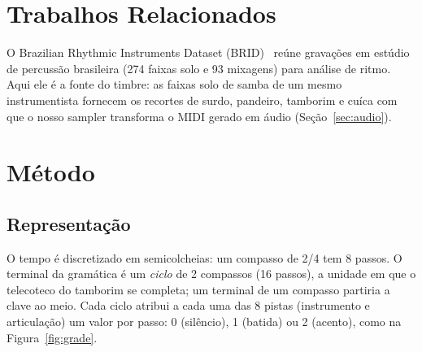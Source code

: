 \documentclass{article}
\begin{document}
\section{Trabalhos Relacionados}\label{sec:relacionados}

O Brazilian Rhythmic Instruments Dataset (BRID)~\cite{maia2018} reúne gravações em estúdio
de percussão brasileira (274 faixas solo e 93 mixagens) para análise de ritmo. Aqui ele é a
fonte do timbre: as faixas solo de samba de um mesmo
instrumentista fornecem os recortes de surdo, pandeiro, tamborim e cuíca com que o nosso
sampler transforma o MIDI gerado em áudio (Seção~\ref{sec:audio}).

\section{Método}\label{sec:metodo}

\subsection{Representação}\label{sec:representacao}

O tempo é discretizado em semicolcheias: um compasso de 2/4 tem 8 passos. O terminal da
gramática é um \emph{ciclo} de 2 compassos (16 passos), a unidade em que o telecoteco do
tamborim se completa; um terminal de um compasso partiria a clave ao meio. Cada ciclo atribui
a cada uma das 8 pistas (instrumento e articulação) um valor por passo: 0 (silêncio),
1 (batida) ou 2 (acento), como na Figura~\ref{fig:grade}.
\end{document}
